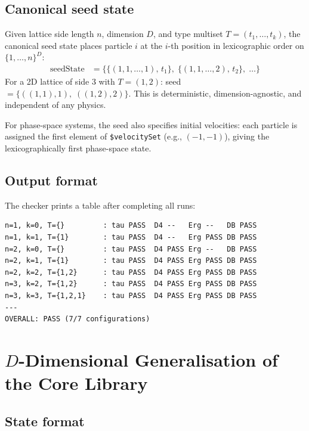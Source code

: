 \documentclass[12pt,a4paper]{article}
\begin{document}
\subsection{Canonical seed state}

Given lattice side length $n$, dimension $D$, and type multiset $T = (t_1,
\ldots, t_k)$, the canonical seed state places particle $i$ at the $i$-th
position in lexicographic order on $\{1,\ldots,n\}^D$:
\begin{align*}
  \text{seedState} &= \bigl\{ \{(1,1,\ldots,1),\, t_1\},\;
                               \{(1,1,\ldots,2),\, t_2\},\; \ldots \bigr\}
\end{align*}
For a 2D lattice of side 3 with $T = (1, 2)$: seed $=\{((1,1),1),\;
((1,2),2)\}$.  This is deterministic, dimension-agnostic, and independent of
any physics.

For phase-space systems, the seed also specifies initial velocities: each
particle is assigned the first element of \texttt{\$velocitySet} (e.g.,
$(-1,-1)$), giving the lexicographically first phase-space state.

\subsection{Output format}

The checker prints a table after completing all runs:

\begin{lstlisting}
n=1, k=0, T={}         : tau PASS  D4 --   Erg --   DB PASS
n=1, k=1, T={1}        : tau PASS  D4 --   Erg PASS DB PASS
n=2, k=0, T={}         : tau PASS  D4 PASS Erg --   DB PASS
n=2, k=1, T={1}        : tau PASS  D4 PASS Erg PASS DB PASS
n=2, k=2, T={1,2}      : tau PASS  D4 PASS Erg PASS DB PASS
n=3, k=2, T={1,2}      : tau PASS  D4 PASS Erg PASS DB PASS
n=3, k=3, T={1,2,1}    : tau PASS  D4 PASS Erg PASS DB PASS
---
OVERALL: PASS (7/7 configurations)
\end{lstlisting}

\section{\texorpdfstring{$D$}{D}-Dimensional Generalisation of the Core Library}
\label{sec:ddim}

\subsection{State format}
\end{document}
